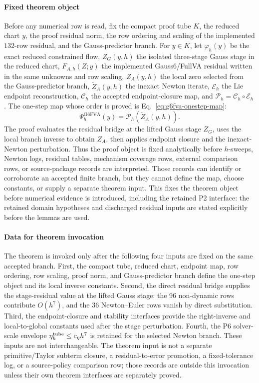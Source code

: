 \documentclass[preprint,12pt]{elsarticle}
\newcommand{\method}{Gauss6\slash FullVA}
\begin{document}
\paragraph{Fixed theorem object}
Before any numerical row is read, fix the compact proof tube \(K\), the
reduced chart \(y\), the proof residual norm, the row ordering and scaling of
the implemented \(132\)-row residual, and the Gauss-predictor branch.  For
\(y\in K\), let \(\varphi_h(y)\) be the exact reduced constrained flow,
\(Z_G(y,h)\) the isolated three-stage Gauss stage in the reduced chart,
\(F_{A,h}(Z;y)\) the implemented \method{} residual written in the same
unknowns and row scaling, \(Z_A(y,h)\) the local zero selected from the
Gauss-predictor branch, \(\widetilde Z_A(y,h)\) the inexact Newton iterate,
\(\mathcal E_h\) the Lie endpoint reconstruction, \(\mathcal C_h\) the
accepted endpoint-closure map, and
\(\mathcal P_h=\mathcal C_h\circ\mathcal E_h\).  The one-step map whose order
is proved is Eq.~\eqref{eq:g6fva-onestep-map}:
\begin{equation}
\label{eq:g6fva-onestep-map}
  \Psi_h^{\mathrm{G6FVA}}(y)=\mathcal P_h(\widetilde Z_A(y,h)).
\end{equation}
The proof evaluates the residual bridge at the lifted Gauss stage \(Z_G\),
uses the local branch inverse to obtain \(Z_A\), then applies endpoint closure
and the inexact-Newton perturbation.  Thus the proof object is fixed
analytically before \(h\)-sweeps, Newton logs, residual tables, mechanism
coverage rows, external comparison rows, or source-package records are interpreted.
Those records can identify or corroborate an accepted finite branch, but they
cannot define the map, choose constants, or supply a separate theorem input.
This fixes the theorem object before numerical evidence is introduced,
including the retained P2 interface: the retained domain hypotheses and
discharged residual inputs are stated explicitly before the lemmas are used.

\paragraph{Data for theorem invocation}
The theorem is invoked only after the following four inputs are fixed on the
same accepted branch.  First, the compact tube, reduced chart, endpoint map,
row ordering, row scaling, proof norm, and Gauss-predictor branch define the
one-step object and its local inverse constants.  Second, the direct
residual bridge supplies the stage-residual value at the lifted Gauss stage:
the 96 non-dynamic rows contribute \(O(h^7)\), and the 36 Newton--Euler rows
vanish by direct substitution.  Third, the endpoint-closure and stability
interfaces provide the right-inverse and local-to-global constants used after
the stage perturbation.  Fourth, the P6 solver-scale envelope
\(\eta_h^{\rm tube}\le c_\eta h^7\) is retained for the selected Newton
branch.  These inputs are not interchangeable. The theorem input is not a
separate primitive/Taylor subterm closure, a residual-to-error promotion, a
fixed-tolerance log, or a source-policy comparison row; those records are
outside this invocation unless their own theorem interfaces are separately
proved.
\end{document}
